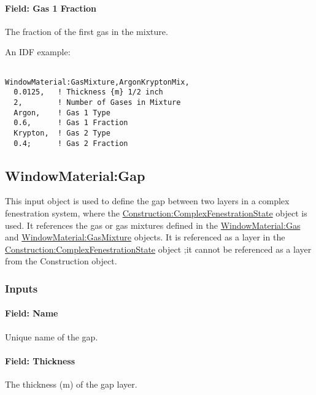 \paragraph{Field: Gas 1 Fraction}\label{field-gas-1-fraction}

The fraction of the first gas in the mixture.

An IDF example:

\begin{lstlisting}

WindowMaterial:GasMixture,ArgonKryptonMix,
  0.0125,   ! Thickness {m} 1/2 inch
  2,        ! Number of Gases in Mixture
  Argon,    ! Gas 1 Type
  0.6,      ! Gas 1 Fraction
  Krypton,  ! Gas 2 Type
  0.4;      ! Gas 2 Fraction
\end{lstlisting}

\subsection{WindowMaterial:Gap}\label{windowmaterialgap}

This input object is used to define the gap between two layers in a complex fenestration system, where the \hyperref[constructioncomplexfenestrationstate]{Construction:ComplexFenestrationState} object is used. It references the gas or gas mixtures defined in the \hyperref[windowmaterialgas]{WindowMaterial:Gas} and \hyperref[windowmaterialgasmixture]{WindowMaterial:GasMixture} objects. It is referenced as a layer in the \hyperref[constructioncomplexfenestrationstate]{Construction:ComplexFenestrationState} object ;it cannot be referenced as a layer from the Construction object.

\subsubsection{Inputs}\label{inputs-18-009}

\paragraph{Field: Name}\label{field-name-12-011}

Unique name of the gap.

\paragraph{Field: Thickness}\label{field-thickness-5}

The thickness (m) of the gap layer.

